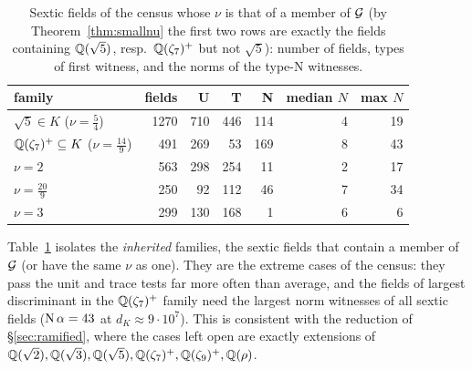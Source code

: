 \begin{table}[t]\caption{Sextic fields of the census whose $\nu$ is that of a member of $\mathcal{G}$ (by Theorem~\ref{thm:smallnu} the first two rows are exactly the fields containing $\mathbb{Q}(\sqrt5)$, resp.~$\mathbb{Q}(\zeta_7)^+$ but not $\sqrt5$): number of fields, types of first witness, and the norms of the type-N witnesses.}\label{tab:inherited}
\begin{tabular}{lrrrrrr}\toprule family & fields & U & T & N & median $N$ & max $N$\\\midrule
$\sqrt5\in K$ ($\nu=\frac54$) & 1270 & 710 & 446 & 114 & 4 & 19\\
$\mathbb{Q}(\zeta_7)^+\subseteq K$ ($\nu=\frac{14}9$) & 491 & 269 & 53 & 169 & 8 & 43\\
$\nu=2$ & 563 & 298 & 254 & 11 & 2 & 17\\
$\nu=\frac{20}9$ & 250 & 92 & 112 & 46 & 7 & 34\\
$\nu=3$ & 299 & 130 & 168 & 1 & 6 & 6\\
\bottomrule\end{tabular}\end{table}
Table~\ref{tab:inherited} isolates the \emph{inherited} families, the sextic fields that contain
a member of $\mathcal{G}$ (or have the same $\nu$ as one). They are the extreme cases of the census: they
pass the unit and trace tests far more often than average, and the fields of largest discriminant in
the $\mathbb{Q}(\zeta_7)^{+}$ family need the largest norm witnesses of all sextic fields ($\operatorname{N}\alpha=43$ at
$d_K\approx9\cdot10^{7}$). This is consistent with the reduction of \S\ref{sec:ramified}, where the
cases left open are exactly extensions of $\mathbb{Q}(\sqrt2),\mathbb{Q}(\sqrt3),\mathbb{Q}(\sqrt5),\mathbb{Q}(\zeta_7)^{+},
\mathbb{Q}(\zeta_9)^{+},\mathbb{Q}(\rho)$.
